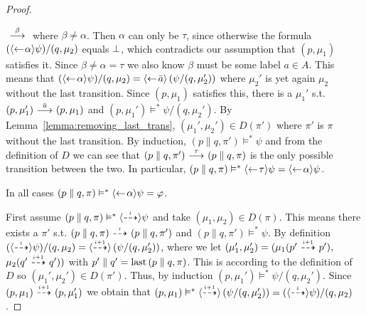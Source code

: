 \begin{proof}
\begin{itemize}
            $\ {\stackrel{{\beta}}{\longrightarrow}}\ $ where $\beta \ne \alpha$. Then $\alpha$ can only be $\tau$,
            since otherwise the formula $(\mbox{\ensuremath{\langle\leftarrow\! \alpha \rangle}}\psi)/(q,\mu_2)$
            equals $\bot$, which contradicts our assumption
            that $(p,\mu_1)$ satisfies it. Since $\beta\ne\alpha = \tau$ we also know $\beta$
            must be some label $a\in A$. This means that $(\mbox{\ensuremath{\langle\leftarrow\! \alpha \rangle}}\psi)/(q,\mu_2)
            = \mbox{\ensuremath{\langle\leftarrow\! \bar{a} \rangle}} \left( \psi / (q, \mu_2') \right)$ where $\mu_2'$ is yet
            again $\mu_2$ without the last transition. Since $(p,\mu_1)$ satisfies this,
            there is a $\mu_1'$ s.t. $(p,\mu_1')\ {\stackrel{{\bar{a}}}{\longrightarrow}}\ (p,\mu_1)$ and $(p,\mu_1')
            \vDash^* \psi/(q,\mu_2')$. By
            Lemma~\ref{lemma:removing_last_trans}, $(\mu_1',\mu_2')\in D(\pi')$ where
            $\pi'$ is $\pi$ without the last transition. By induction, $(p\parallel q, \pi')
            \vDash^* \psi$ and from the definition of $D$ we can see that $(p\parallel q,\pi')
            \ {\stackrel{{\tau}}{\longrightarrow}}\  (p\parallel q,\pi)$ is the only possible transition between the
            two. In particular,
            $(p\parallel q,\pi) \vDash^* \mbox{\ensuremath{\langle\leftarrow\! \tau \rangle}} \psi
            = \mbox{\ensuremath{\langle\leftarrow\! \alpha \rangle}}\psi$.
    \end{itemize}
    In all cases $(p\parallel q,\pi) \vDash^* \mbox{\ensuremath{\langle\leftarrow\! \alpha \rangle}}\psi = \varphi$.




    \ltr First assume $(p\parallel q, \pi) \vDash^* \mbox{\ensuremath{\langle\stackrel{_{i}}{\dashrightarrow}\rangle}}\psi$ and take $(\mu_1,\mu_2)
    \in D(\pi)$. This means there exists
    a $\pi'$ s.t. $(p\parallel q, \pi) \ {\stackrel{_{i}}{\dashrightarrow}}\  (p\parallel q, \pi')$ and $(p\parallel q,
    \pi')\vDash^* \psi$. By definition
    $(\mbox{\ensuremath{\langle\stackrel{_{i}}{\dashrightarrow}\rangle}}\psi)/(q,\mu_2) = \mbox{\ensuremath{\langle\stackrel{_{i+1}}{\dashrightarrow}\rangle}} \left( \psi / (q, \mu_2') \right)$,
    where we let $(\mu_1',
    \mu_2') = (\mu_1(p'\ {\stackrel{_{i+1}}{\dashrightarrow}}\ p'),$ $\mu_2(q'\ {\stackrel{_{i+1}}{\dashrightarrow}}\ q'))$ with $p' \parallel q' =
    \operatorname{last}{(p\parallel q, \pi)}$. This is according to the definition of $D$ so $(\mu_1',\mu_2')
    \in D(\pi')$. Thus, by induction $(p,\mu_1') \vDash^* \psi / (q,\mu_2')$. Since $(p,\mu_1)
    \ {\stackrel{_{i+1}}{\dashrightarrow}}\  (p,\mu_1')$ we obtain that $(p,\mu_1) \vDash^* \mbox{\ensuremath{\langle\stackrel{_{i+1}}{\dashrightarrow}\rangle}} \left(
    \psi / (q,\mu_2') \right) = (\mbox{\ensuremath{\langle\stackrel{_{i}}{\dashrightarrow}\rangle}}\psi)/(q,\mu_2)$.


\end{proof}
